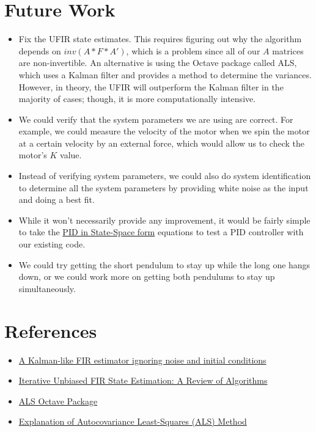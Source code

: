 \documentclass{article}
\begin{document}
\section{Future Work}
\begin{itemize}
\item Fix the UFIR state estimates. This requires figuring out why the algorithm depends on $inv(A*F*A')$, which is a problem since all of our $A$ matrices are non-invertible. An alternative is using the Octave package called ALS, which uses a Kalman filter and provides a method to determine the variances. However, in theory, the UFIR will outperform the Kalman filter in the majority of cases; though, it is more computationally intensive.
\item We could verify that the system parameters we are using are correct. For example, we could measure the velocity of the motor when we spin the motor at a certain velocity by an external force, which would allow us to check the motor's $K$ value.
\item Instead of verifying system parameters, we could also do system identification to determine all the system parameters by providing white noise as the input and doing a best fit.
\item While it won't necessarily provide any improvement, it would be fairly simple to take the \href{https://github.com/floft/PIDinStateSpace}{PID in State-Space form} equations to test a PID controller with our existing code.
\item We could try getting the short pendulum to stay up while the long one hangs down, or we could work more on getting both pendulums to stay up simultaneously.
\end{itemize}

\section{References}
\begin{itemize}
\item \href{https://www.researchgate.net/publication/233854533_A_Kalman-like_FIR_estimator_ignoring_noise_and_initial_conditions}{A Kalman-like FIR estimator ignoring noise and initial conditions}
\item \href{http://engagedscholarship.csuohio.edu/cgi/viewcontent.cgi?article=1214&context=enece_facpub}{Iterative Unbiased FIR State Estimation: A Review of Algorithms}
\item \href{http://jbrwww.che.wisc.edu/software/als/index.html}{ALS Octave Package}
\item \href{http://jbrwww.che.wisc.edu/tech-reports/twmcc-2007-02.pdf}{Explanation of Autocovariance Least-Squares (ALS) Method}
\end{itemize}
\end{document}
